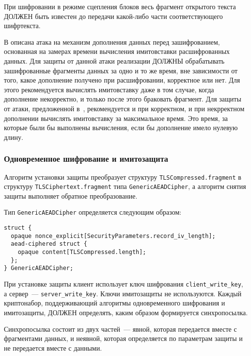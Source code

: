 \begin{note}
При шифровании в режиме сцепления блоков весь фрагмент открытого текста ДОЛЖЕН
быть известен до передачи какой-либо части соответствующего шифртекста.
\end{note}

\begin{note}
В \cite{PwdInterception} описана атака на механизм дополнения данных перед
зашифрованием, основанная на замерах времени вычисления имитовставки
расшифрованных данных. Для защиты от данной атаки реализации ДОЛЖНЫ обрабатывать
зашифрованные фрагменты данных за одно и то же время, вне зависимости от того,
какое дополнение получено при расшифровании, корректное или нет. Для этого
рекомендуется вычислять имитовставку даже в том случае, когда дополнение
некорректно, и только после этого браковать фрагмент. Для защиты от атаки,
предложенной в~\cite{Lucky13}, рекомендуется и при корректном, и при некрректном
дополнении вычислять имитовставку за максимальное время. Это время, за которые
были бы выполнены вычисления, если бы дополнение имело нулевую длину.
\end{note}

\subsubsection{Одновременное шифрование и имитозащита}\label{RECORD.3.3.3}

Алгоритм установки защиты преобразует структуру 
\lstinline{TLSCompressed.fragment} в структуру 
\lstinline{TLSCiphertext.fragment} типа \lstinline{GenericAEADCipher}, а 
алгоритм снятия защиты выполняет обратное преобразование. 

Тип \lstinline{GenericAEADCipher} определяется следующим образом:
\begin{lstlisting}
struct {
  opaque nonce_explicit[SecurityParameters.record_iv_length];
  aead-ciphered struct {
    opaque content[TLSCompressed.length];
  };
} GenericAEADCipher;
\end{lstlisting}

При установке защиты клиент использует ключ шифрования \lstinline{client_write_key}, 
а сервер~--- \lstinline{server_write_key}. Ключи имитозащиты не используются. 
Каждый криптонабор, поддерживающий алгоритмы одновременного шифрования и 
имитозащиты, ДОЛЖЕН определять, каким образом формируется синхропосылка. 

Синхропосылка состоит из двух частей~--- явной, которая передается вместе с 
фрагментами данных, и неявной, которая определяется по параметрам защиты 
и не передается вместе с данными.   

